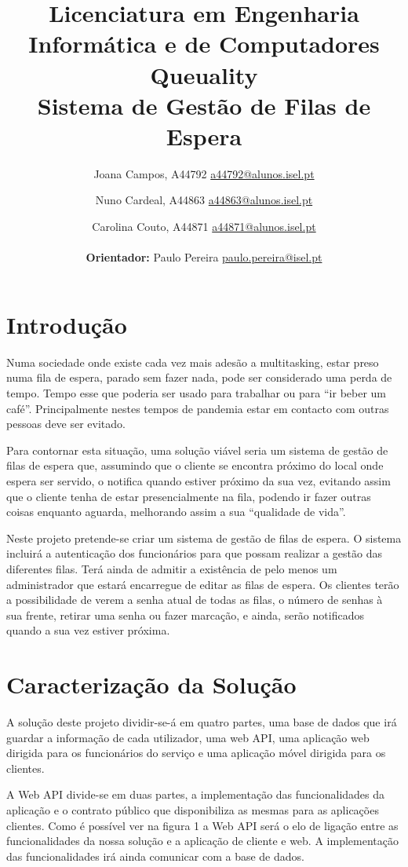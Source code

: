 \documentclass[12pt,a4paper]{article}
\title{
    \textbf{Licenciatura em Engenharia Informática e de Computadores} \vspace{5mm} \\
    \textbf{Queuality} \\ 
    Sistema de Gestão de Filas de Espera
}
\author{
    Joana Campos, A44792 \href{mailto:a44792@alunos.isel.pt}{a44792@alunos.isel.pt} 
    \and Nuno Cardeal, A44863 \href{mailto:a44863@alunos.isel.pt}{a44863@alunos.isel.pt}
    \and Carolina Couto, A44871 \href{mailto:a44871@alunos.isel.pt}{a44871@alunos.isel.pt} \\
    \\
    \textbf{Orientador:} Paulo Pereira \href{mailto:paulo.pereira@isel.pt}{paulo.pereira@isel.pt}
}
\begin{document}
\maketitle
\pagebreak
\tableofcontents

\pagebreak
\section{Introdução}
Numa sociedade onde existe cada vez mais adesão a multitasking, estar preso numa fila de espera,
parado sem fazer nada, pode ser considerado uma perda de tempo. Tempo esse que poderia ser usado
para trabalhar ou para “ir beber um café”. Principalmente nestes tempos de pandemia estar em contacto
com outras pessoas deve ser evitado.

Para contornar esta situação, uma solução viável seria um sistema de gestão de filas de espera que,
assumindo que o cliente se encontra próximo do local onde espera ser servido, o notifica quando estiver
próximo da sua vez, evitando assim que o cliente tenha de estar presencialmente na fila, podendo ir
fazer outras coisas enquanto aguarda, melhorando assim a sua “qualidade de vida”.

Neste projeto pretende-se criar um sistema de gestão de filas de espera. O sistema incluirá a
autenticação dos funcionários para que possam realizar a gestão das diferentes filas. Terá ainda de
admitir a existência de pelo menos um administrador que estará encarregue de editar as filas de espera.
Os clientes terão a possibilidade de verem a senha atual de todas as filas, o número de senhas à sua
frente, retirar uma senha ou fazer marcação, e ainda, serão notificados quando a sua vez estiver próxima. 

\pagebreak
\section{Caracterização da Solução}
A solução deste projeto dividir-se-á em quatro partes, uma base de dados que irá guardar a
informação de cada utilizador, uma web API, uma aplicação web dirigida para os funcionários do
serviço e uma aplicação móvel dirigida para os clientes. 

A Web API divide-se em duas partes, a implementação das funcionalidades da aplicação e o
contrato público que disponibiliza as mesmas para as aplicações clientes. Como é possível ver na figura
1 a Web API será o elo de ligação entre as funcionalidades da nossa solução e a aplicação de cliente e
web. A implementação das funcionalidades irá ainda comunicar com a base de dados.
\end{document}
